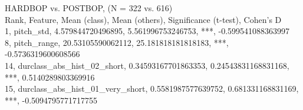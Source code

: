 HARDBOP vs. POSTBOP, (N = 322 vs. 616)\\
Rank, Feature, Mean (class), Mean (others), Significance (t-test), Cohen's D\\
1, pitch_std, 4.579844720496895, 5.561996753246753, ***, -0.599541088363997\\
8, pitch_range, 20.53105590062112, 25.181818181818183, ***, -0.5736319600608566\\
14, durclass_abs_hist_02_short, 0.34593167701863353, 0.24543831168831168, ***, 0.5140289803369916\\
15, durclass_abs_hist_01_very_short, 0.5581987577639752, 0.681331168831169, ***, -0.5094795771717755\\
